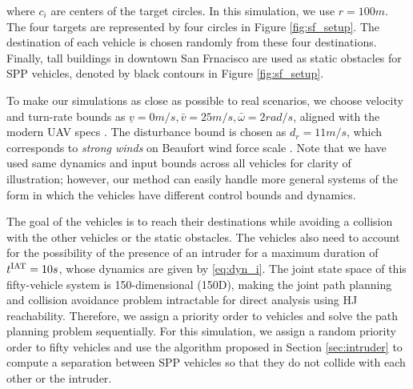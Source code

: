\noindent where $c_i$ are centers of the target circles. In this simulation, we use $r = 100m$. %
The four targets are represented by four circles in Figure \ref{fig:sf_setup}. The destination of each vehicle is chosen randomly from these four destinations. Finally, tall buildings in downtown San Frnacisco are used as static obstacles for SPP vehicles, denoted by black contours in Figure \ref{fig:sf_setup}.

To make our simulations as close as possible to real scenarios, we choose velocity and turn-rate bounds as $\underline{v} = 0m/s, \bar{v} = 25m/s, \bar\omega = 2 rad/s$, aligned with the modern UAV specs \cite{UAVspecs1, UAVspecs2}. The disturbance bound is chosen as $d_{r} = 11 m/s$, which corresponds to \textit{strong winds} on Beaufort wind force scale \cite{Windscale}. Note that we have used same dynamics and input bounds across all vehicles for clarity of illustration; however, our method can easily handle more general systems of the form in which the vehicles have different control bounds and dynamics.

The goal of the vehicles is to reach their destinations while avoiding a collision with the other vehicles or the static obstacles. The vehicles also need to account for the possibility of the presence of an intruder for a maximum duration of $t^\text{IAT} = 10s$, whose dynamics are given by \eqref{eq:dyn_i}. The joint state space of this fifty-vehicle system is 150-dimensional (150D), making the joint path planning and collision avoidance problem intractable for direct analysis using HJ reachability. Therefore, we assign a priority order to vehicles and solve the path planning problem sequentially. For this simulation, we assign a random priority order to fifty vehicles and use the algorithm proposed in Section \ref{sec:intruder} to compute a separation between SPP vehicles so that they do not collide with each other or the intruder. 

